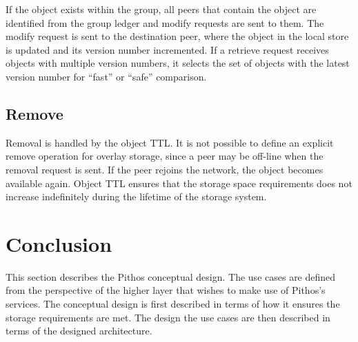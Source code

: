 If the object exists within the group, all peers that contain the object are identified from the group ledger and modify requests are sent to them. The modify request is sent to the destination peer, where the object in the local store is updated and its version number incremented. If a retrieve request receives objects with multiple version numbers, it selects the set of objects with the latest version number for ``fast'' or ``safe'' comparison.

\subsection{Remove}

Removal is handled by the object TTL. It is not possible to define an explicit remove operation for overlay storage, since a peer may be off-line when the removal request is sent. If the peer rejoins the network, the object becomes available again. Object TTL ensures that the storage space requirements does not increase indefinitely during the lifetime of the storage system.

\section{Conclusion}

This section describes the Pithos conceptual design. The use cases are defined from the perspective of the higher layer that wishes to make use of Pithos's services. The conceptual design is first described in terms of how it ensures the storage requirements are met. The design the use cases are then described in terms of the designed architecture.